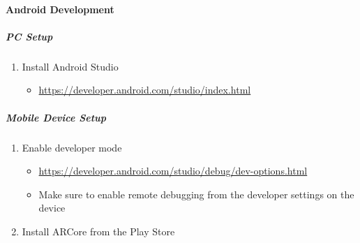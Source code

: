\paragraph{Android Development}

\subparagraph{PC Setup}
\begin{enumerate}
    \item Install Android Studio
    \begin{itemize}
        \item \url{https://developer.android.com/studio/index.html}
    \end{itemize}

\end{enumerate}

\subparagraph{Mobile Device Setup}
\begin{enumerate}
    \item Enable developer mode
    \begin{itemize}
        \item \url{https://developer.android.com/studio/debug/dev-options.html}
        \item Make sure to enable remote debugging from the developer settings on the device
    \end{itemize}

    \item Install ARCore from the Play Store
\end{enumerate}